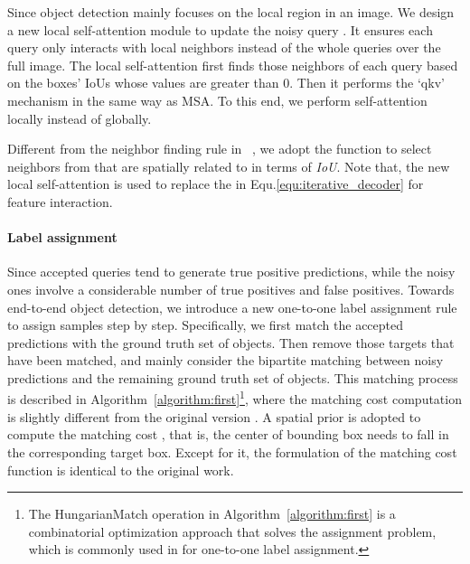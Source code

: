 \documentclass[final]{cvpr}
\begin{document}
Since object detection mainly focuses on the local region in an image. We design a new local self-attention module   to update the noisy query .  It ensures each query only interacts with local neighbors instead of the whole queries over the full image. The local self-attention first finds those neighbors of each query based on the boxes' IoUs whose values are greater than 0. Then it performs the `qkv' mechanism in the same way as MSA. To this end, we perform self-attention locally instead of globally.

Different from the neighbor finding rule in ~\cite{lin2020detr}, we adopt the function  to select neighbors from  that are spatially related to  in terms of \textit{IoU}. Note that, the new local self-attention  is used to replace the  in Equ.\eqref{equ:iterative_decoder} for feature interaction.

\vspace{-0.5cm}
\paragraph{Label assignment}


Since accepted queries tend to generate true positive predictions, while the noisy ones involve a considerable number of true positives and false positives. Towards end-to-end object detection, we introduce a new one-to-one label assignment rule to assign samples step by step. Specifically, we first match the accepted predictions  with the ground truth set of objects. Then remove those targets that have been matched, and mainly consider the bipartite matching between noisy predictions  and the remaining ground truth set of objects. This matching process is described in Algorithm~\ref{algorithm:first}\footnote{The HungarianMatch operation in Algorithm~\ref{algorithm:first} is a combinatorial optimization approach that solves the assignment problem, which is commonly used in \cite{carion2020end, sun2020sparse, zhu2021deformable, wang2020end} for one-to-one label assignment.}, where the matching cost computation is slightly different from the original version \cite{sun2020sparse}. A spatial prior is adopted to compute the matching cost , that is, the center of bounding box  needs to fall in the corresponding target box. Except for it, the formulation of the matching cost function is identical to the original work.
\end{document}

